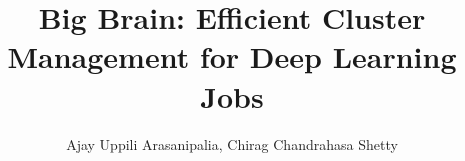 \documentclass[sigplan,screen,10pt]{acmart}
\begin{document}
\title{Big Brain: Efficient Cluster Management for Deep Learning Jobs}

\author{Ajay Uppili Arasanipalia, Chirag Chandrahasa Shetty}



\maketitle



%




\end{document}
